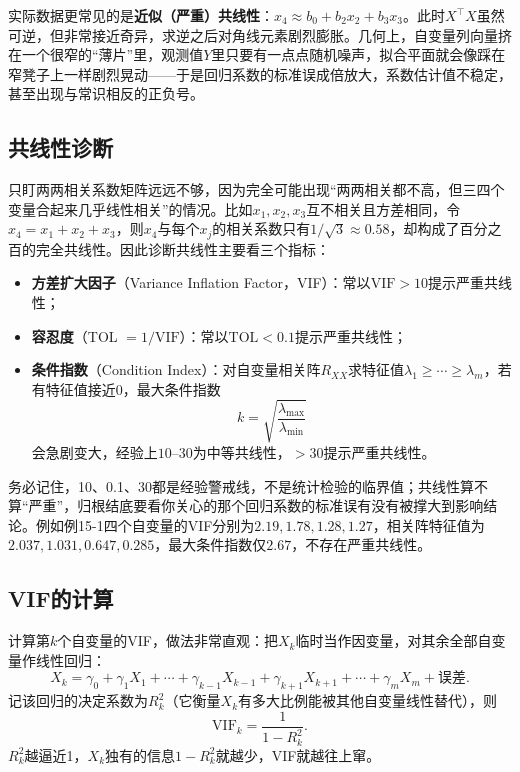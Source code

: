实际数据更常见的是\textbf{近似（严重）共线性}：$x_4\approx b_0+b_2x_2+b_3x_3$。此时$X^\top X$虽然可逆，但非常接近奇异，求逆之后对角线元素剧烈膨胀。几何上，自变量列向量挤在一个很窄的“薄片”里，观测值$Y$里只要有一点点随机噪声，拟合平面就会像踩在窄凳子上一样剧烈晃动——于是回归系数的标准误成倍放大，系数估计值不稳定，甚至出现与常识相反的正负号。

\subsection{共线性诊断}
只盯两两相关系数矩阵远远不够，因为完全可能出现“两两相关都不高，但三四个变量合起来几乎线性相关”的情况。比如$x_1,x_2,x_3$互不相关且方差相同，令$x_4=x_1+x_2+x_3$，则$x_4$与每个$x_j$的相关系数只有$1/\sqrt 3\approx 0.58$，却构成了百分之百的完全共线性。因此诊断共线性主要看三个指标：
\begin{itemize}
\item \textbf{方差扩大因子}（Variance Inflation Factor，VIF）：常以$\mathrm{VIF}>10$提示严重共线性；
\item \textbf{容忍度}（TOL $=1/\mathrm{VIF}$）：常以$\mathrm{TOL}<0.1$提示严重共线性；
\item \textbf{条件指数}（Condition Index）：对自变量相关阵$R_{XX}$求特征值$\lambda_1\ge\cdots\ge\lambda_m$，若有特征值接近0，最大条件指数
\[
k=\sqrt{\frac{\lambda_{\max}}{\lambda_{\min}}}
\]
会急剧变大，经验上$10$--$30$为中等共线性，$>30$提示严重共线性。
\end{itemize}
务必记住，10、0.1、30都是经验警戒线，不是统计检验的临界值；共线性算不算“严重”，归根结底要看你关心的那个回归系数的标准误有没有被撑大到影响结论。例如例15-1四个自变量的VIF分别为$2.19,1.78,1.28,1.27$，相关阵特征值为$2.037,1.031,0.647,0.285$，最大条件指数仅$2.67$，不存在严重共线性。

\subsection{VIF的计算}
计算第$k$个自变量的VIF，做法非常直观：把$X_k$临时当作因变量，对其余全部自变量作线性回归：
\[
X_k=\gamma_0+\gamma_1X_1+\cdots+\gamma_{k-1}X_{k-1}
+\gamma_{k+1}X_{k+1}+\cdots+\gamma_mX_m+\text{误差}.
\]
记该回归的决定系数为$R_k^2$（它衡量$X_k$有多大比例能被其他自变量线性替代），则
\[
\mathrm{VIF}_k=\frac1{1-R_k^2}.
\]
$R_k^2$越逼近1，$X_k$独有的信息$1-R_k^2$就越少，VIF就越往上窜。

